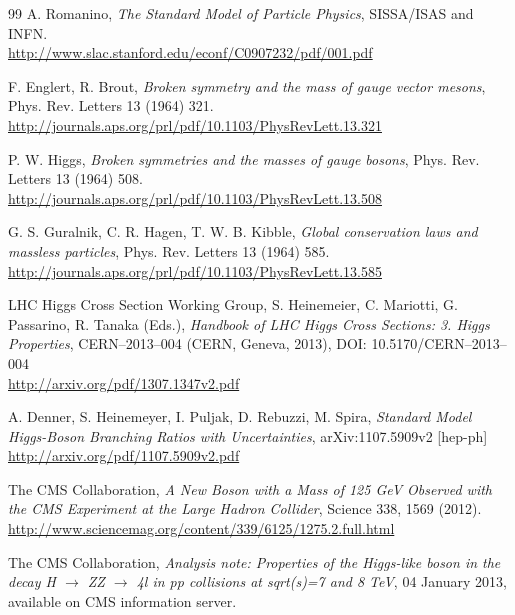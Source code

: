 \documentclass[a4paper,12pt]{article}
\begin{document}
	
\clearpage
{}
\begin{thebibliography}{99}
	 A. Romanino, \emph{The Standard Model of Particle Physics}, SISSA/ISAS and INFN.
	\\ \url{http://www.slac.stanford.edu/econf/C0907232/pdf/001.pdf}
	
	 F. Englert, R. Brout, \emph{Broken symmetry and the mass of gauge vector mesons}, Phys. Rev. Letters 13 (1964) 321. 
	\\ \url{http://journals.aps.org/prl/pdf/10.1103/PhysRevLett.13.321}
	
	 P. W. Higgs, \emph{Broken symmetries and the masses of gauge bosons}, Phys. Rev. Letters 13 (1964) 508.
	\\ \url{http://journals.aps.org/prl/pdf/10.1103/PhysRevLett.13.508}
	
	 G. S. Guralnik, C. R. Hagen, T. W. B. Kibble, \emph{Global conservation laws and massless particles}, Phys. Rev. Letters 13 (1964) 585.
	\\ \url{http://journals.aps.org/prl/pdf/10.1103/PhysRevLett.13.585} 
	
	 LHC Higgs Cross Section Working Group, S. Heinemeier, C. Mariotti, G. Passarino, R. Tanaka (Eds.), \emph{Handbook of LHC Higgs Cross Sections: 3. Higgs Properties}, CERN–2013–004 (CERN, Geneva, 2013), DOI: 10.5170/CERN–2013–004
	\\ \url{http://arxiv.org/pdf/1307.1347v2.pdf}
		 
	 A. Denner, S. Heinemeyer, I. Puljak, D. Rebuzzi, M. Spira, \emph{Standard Model Higgs-Boson Branching Ratios with Uncertainties}, arXiv:1107.5909v2 [hep-ph]
	\\ \url{http://arxiv.org/pdf/1107.5909v2.pdf}
	
	 The CMS Collaboration, \emph{A New Boson with a Mass of 125 GeV Observed with the CMS Experiment at the Large Hadron Collider}, Science 338, 1569 (2012).
	\\ \url{http://www.sciencemag.org/content/339/6125/1275.2.full.html}
	
	 The CMS Collaboration, \emph{Analysis note: Properties of the Higgs-like boson in the decay H $\rightarrow$ ZZ $\rightarrow$ 4l in pp collisions at sqrt(s)=7 and 8 TeV}, 04 January 2013, available on CMS information server.


\end{thebibliography}
\end{document}
